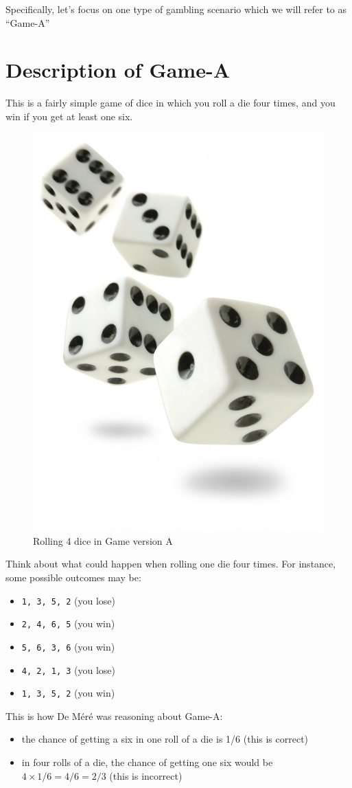 \documentclass[
]{book}
\begin{document}
Specifically, let's focus on one type of gambling scenario which we will
refer to as ``Game-A''

\hypertarget{description-of-game-a}{%
\section{Description of Game-A}\label{description-of-game-a}}

This is a fairly simple game of dice in which you roll a die four times, and
you win if you get at least one six.

\begin{figure}

{\centering \includegraphics[width=0.3\linewidth]{images/rolling-four-dice} 

}

\caption{Rolling 4 dice in Game version A}\label{fig:unnamed-chunk-3}
\end{figure}

Think about what could happen when rolling one die four times. For instance,
some possible outcomes may be:

\begin{itemize}
\item
  \texttt{1,\ 3,\ 5,\ 2} (you lose)
\item
  \texttt{2,\ 4,\ 6,\ 5} (you win)
\item
  \texttt{5,\ 6,\ 3,\ 6} (you win)
\item
  \texttt{4,\ 2,\ 1,\ 3} (you lose)
\item
  \texttt{1,\ 3,\ 5,\ 2} (you win)
\end{itemize}

This is how De Méré was reasoning about Game-A:

\begin{itemize}
\item
  the chance of getting a six in one roll of a die is 1/6 (this is correct)
\item
  in four rolls of a die, the chance of getting one six would be
  \(4 \times 1/6 = 4/6 = 2/3\) (this is incorrect)
\end{itemize}
\end{document}
